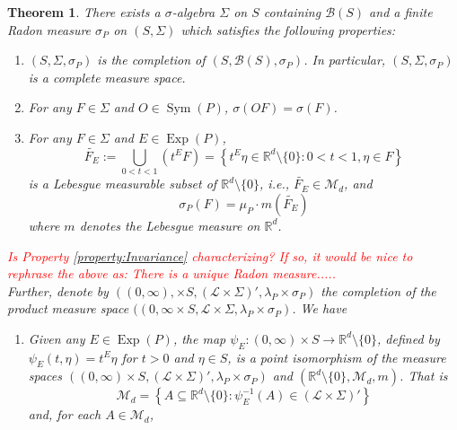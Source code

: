 \documentclass[11pt]{article}
\newtheorem{theorem}{Theorem}[section]
\newcommand\Sym{\operatorname{Sym}}
\newcommand\Exp{\operatorname{Exp}}
\begin{document}
\begin{theorem}\label{thm:BestIntegrationFormula}
There exists a $\sigma$-algebra $\Sigma$ on $S$ containing $\mathcal{B}(S)$ and a finite Radon measure $\sigma_P$ on $(S,\Sigma)$ which satisfies the following properties:
\begin{enumerate}
\item\label{property:Completion} $(S,\Sigma,\sigma_P)$ is the completion of $(S,\mathcal{B}(S),\sigma_P)$. In particular, $(S,\Sigma,\sigma_P)$ is a complete measure space.
\item\label{property:Invariance} For any $F\in\Sigma$ and $O\in\Sym(P)$, $\sigma(OF)=\sigma(F)$.
\item\label{property:DefiningConditionofsigma} For any $F\in\Sigma$ and $E\in\Exp(P)$, 
\begin{equation*}
\widetilde{F_E}:=\bigcup_{0<t<1}\left(t^E F\right)=\left\{t^E\eta\in\mathbb{R}^d\setminus\{0\}:0<t<1,\eta\in F\right\}
\end{equation*}
is a Lebesgue measurable subset of $\mathbb{R}^d\setminus \{0\}$, i.e., $\widetilde{F_E}\in\mathcal{M}_d$, and
\begin{equation*}
\sigma_P(F)=\mu_P\cdot m\left(\widetilde{F_E}\right)
\end{equation*}
where $m$ denotes the Lebesgue measure on $\mathbb{R}^d$.
\end{enumerate}
\textcolor{red}{Is Property \ref{property:Invariance} characterizing? If so, it would be nice to rephrase the above as: There is a unique Radon measure..... \\}
Further, denote by $\left((0,\infty),\times S,(\mathcal{L}\times\Sigma)',\lambda_P\times\sigma_P\right)$ the completion of the product measure space $((0,\infty\times S,\mathcal{L}\times\Sigma,\lambda_P\times\sigma_P)$. We have
\begin{enumerate}
\item\label{property:BestPointIsomorphism} Given any $E\in \Exp(P)$, the map $\psi_E:(0,\infty)\times S\to\mathbb{R}^d\setminus\{0\}$, defined by $\psi_E(t,\eta)=t^E\eta$ for $t>0$ and $\eta\in S$, is a point isomorphism of the measure spaces $\left((0,\infty)\times S,(\mathcal{L}\times\Sigma)',\lambda_P\times\sigma_P\right)$ and $(\mathbb{R}^d\setminus\{0\},\mathcal{M}_d,m)$. That is
\begin{equation*}
\mathcal{M}_d=\left\{A\subseteq \mathbb{R}^d\setminus\{0\}:\psi_E^{-1}(A)\in (\mathcal{L}\times\Sigma)'\right\}
\end{equation*}
and, for each $A\in\mathcal{M}_d$,
\begin{equation*}

\end{equation*}
\end{enumerate}
\end{theorem}
\end{document}
